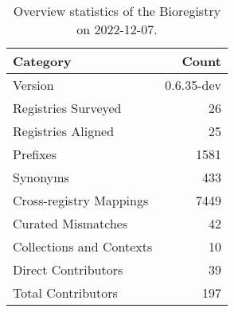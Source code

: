 \begin{table}
\centering
\caption{Overview statistics of the Bioregistry on 2022-12-07.}
\label{tab:bioregistry-summary}
\begin{tabular}{lr}
\toprule
                Category &      Count \\
\midrule
                 Version & 0.6.35-dev \\
     Registries Surveyed &         26 \\
      Registries Aligned &         25 \\
                Prefixes &       1581 \\
                Synonyms &        433 \\
 Cross-registry Mappings &       7449 \\
      Curated Mismatches &         42 \\
Collections and Contexts &         10 \\
     Direct Contributors &         39 \\
      Total Contributors &        197 \\
\bottomrule
\end{tabular}
\end{table}
